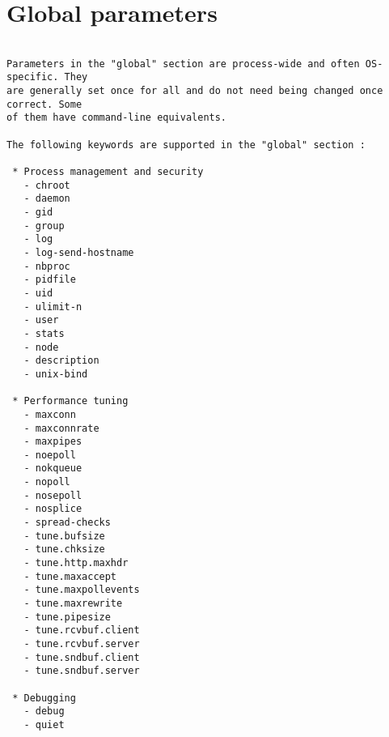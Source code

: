 
\chapter{Global parameters}

\begin{verbatim}

Parameters in the "global" section are process-wide and often OS-specific. They
are generally set once for all and do not need being changed once correct. Some
of them have command-line equivalents.

The following keywords are supported in the "global" section :

 * Process management and security
   - chroot
   - daemon
   - gid
   - group
   - log
   - log-send-hostname
   - nbproc
   - pidfile
   - uid
   - ulimit-n
   - user
   - stats
   - node
   - description
   - unix-bind

 * Performance tuning
   - maxconn
   - maxconnrate
   - maxpipes
   - noepoll
   - nokqueue
   - nopoll
   - nosepoll
   - nosplice
   - spread-checks
   - tune.bufsize
   - tune.chksize
   - tune.http.maxhdr
   - tune.maxaccept
   - tune.maxpollevents
   - tune.maxrewrite
   - tune.pipesize
   - tune.rcvbuf.client
   - tune.rcvbuf.server
   - tune.sndbuf.client
   - tune.sndbuf.server

 * Debugging
   - debug
   - quiet


\end{verbatim}
